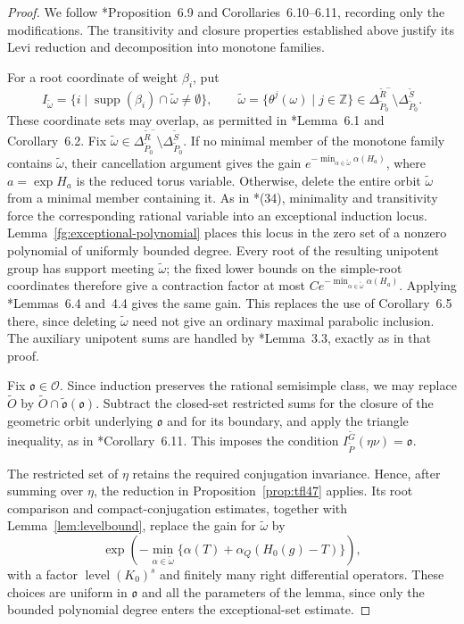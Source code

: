 \documentclass[12pt]{amsart}
\theoremstyle{definition}
\theoremstyle{plain}
\theoremstyle{remark}
\def\Z{\mathbb{Z}}%
\newcommand{\fo}{\mathfrak{o}}
\newcommand{\cO}{\mathcal{O}}
\numberwithin{equation}{section}
\newcommand{\tG}{\widetilde{G}}
\newcommand{\tP}{\widetilde{P}}
\newcommand{\tR}{\widetilde{R}}
\newcommand{\tS}{\widetilde{S}}
\newcommand{\tfo}{\widetilde{\mathfrak{o}}}
\newcommand{\level}{\operatorname{level}}
\newcommand{\tomega}{\widetilde{\omega}}
\begin{document}
\begin{proof}
We follow \cite{FL16}*{Proposition~6.9 and
Corollaries~6.10--6.11}, recording only the modifications.
The transitivity and closure properties established above
justify its Levi reduction and decomposition into monotone
families.

For a root coordinate of weight $\beta_i$, put
\[
 I_{\tomega}=\{i\mid \operatorname{supp}(\beta_i)\cap \tomega\ne\emptyset\},
 \qquad \tomega=\{ \theta^j(\omega)\mid j\in\Z \}\in\Delta_{\tP_0}^{\tR^-}\setminus\Delta_{\tP_0}^{\tS}.
\]
These coordinate sets may overlap, as permitted in
\cite{FL16}*{Lemma~6.1 and Corollary~6.2}.
Fix $\tomega\in\Delta_{\tP_0}^{\tR^-}\setminus\Delta_{\tP_0}^{\tS}$.
If no minimal member of the monotone family contains $\tomega$,
their cancellation argument gives the gain
$e^{-\min_{\alpha\in \tomega}\alpha(H_a)}$, where
$a=\exp H_a$ is the reduced torus variable.
Otherwise, delete the entire orbit $\tomega$ from a minimal member containing it.
As in \cite{FL16}*{(34)}, minimality and transitivity force
the corresponding rational variable into an exceptional
induction locus.
Lemma~\ref{fg:exceptional-polynomial} places this locus in
the zero set of a nonzero polynomial of uniformly bounded
degree.
Every root of the resulting unipotent group has support
meeting $\tomega$; the fixed lower bounds on the simple-root
coordinates therefore give a contraction factor at most
$C e^{-\min_{\alpha\in \tomega}\alpha(H_a)}$.
Applying \cite{FL16}*{Lemmas~6.4 and~4.4} gives the same gain.
This replaces the use of Corollary~6.5 there, since deleting
$\tomega$ need not give an ordinary maximal parabolic inclusion.
The auxiliary unipotent sums are handled by
\cite{FL16}*{Lemma~3.3}, exactly as in that proof.

Fix $\fo\in\cO$.
Since induction preserves the rational semisimple class,
we may replace $\widetilde O$ by
$\widetilde O\cap\tfo(\fo)$.
Subtract the closed-set restricted sums for the closure
of the geometric orbit underlying $\fo$ and for its boundary,
and apply the triangle inequality, as in
\cite{FL16}*{Corollary~6.11}.
This imposes the condition
$I_{\tP}^{\tG}(\eta\nu)=\fo$.

The restricted set of $\eta$ retains the required conjugation
invariance.
Hence, after summing over $\eta$, the reduction in
Proposition~\ref{prop:tfl47} applies.
Its root comparison and compact-conjugation estimates,
together with Lemma~\ref{lem:levelbound}, replace the gain
for $\tomega$ by
\[
 \exp\!\left(
   -\min_{\alpha\in \tomega}
       \{\alpha(T)+\alpha_Q(H_0(g)-T)\}
 \right),
\]
with a factor $\level(K_0)^s$ and finitely many right
differential operators.
These choices are uniform in $\fo$ and all the parameters
of the lemma, since only the bounded polynomial degree
enters the exceptional-set estimate.


\end{proof}
\end{document}

